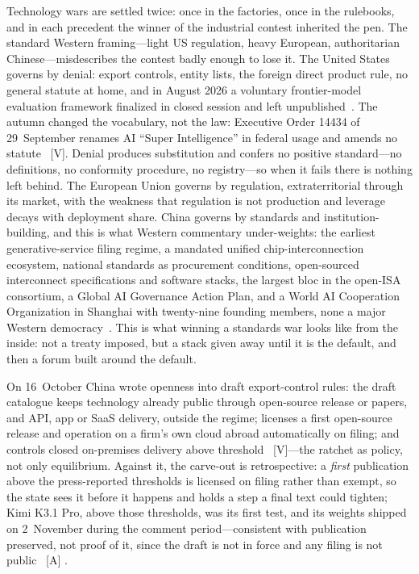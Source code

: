 Technology wars are settled twice: once in the factories, once in the rulebooks, and in each precedent the winner of the industrial contest inherited the pen. The standard Western framing---light US regulation, heavy European, authoritarian Chinese---misdescribes the contest badly enough to lose it. The United States governs by denial: export controls, entity lists, the foreign direct product rule, no general statute at home, and in August 2026 a voluntary frontier-model evaluation framework finalized in closed session and left unpublished~\cite{wh-framework}. The autumn changed the vocabulary, not the law: Executive Order 14434 of 29~September renames AI ``Super Intelligence'' in federal usage and amends no statute~\cite{gov-eo14434} [V]. Denial produces substitution and confers no positive standard---no definitions, no conformity procedure, no registry---so when it fails there is nothing left behind. The European Union governs by regulation, extraterritorial through its market, with the weakness that regulation is not production and leverage decays with deployment share. China governs by standards and institution-building, and this is what Western commentary under-weights: the earliest generative-service filing regime, a mandated unified chip-interconnection ecosystem, national standards as procurement conditions, open-sourced interconnect specifications and software stacks, the largest bloc in the open-ISA consortium, a Global AI Governance Action Plan, and a World AI Cooperation Organization in Shanghai with twenty-nine founding members, none a major Western democracy~\cite{action-plan,waico}. This is what winning a standards war looks like from the inside: not a treaty imposed, but a stack given away until it is the default, and then a forum built around the default.

On 16~October China wrote openness into draft export-control rules: the draft catalogue keeps technology already public through open-source release or papers, and API, app or SaaS delivery, outside the regime; licenses a first open-source release and operation on a firm's own cloud abroad automatically on filing; and controls closed on-premises delivery above threshold~\cite{gov-mofcom-catalogue} [V]---the ratchet as policy, not only equilibrium. Against it, the carve-out is retrospective: a \emph{first} publication above the press-reported thresholds is licensed on filing rather than exempt, so the state sees it before it happens and holds a step a final text could tighten; Kimi K3.1 Pro, above those thresholds, was its first test, and its weights shipped on 2~November during the comment period---consistent with publication preserved, not proof of it, since the draft is not in force and any filing is not public~\cite{gov-catalogue-thresholds,lit-k31-weights} [A] .

